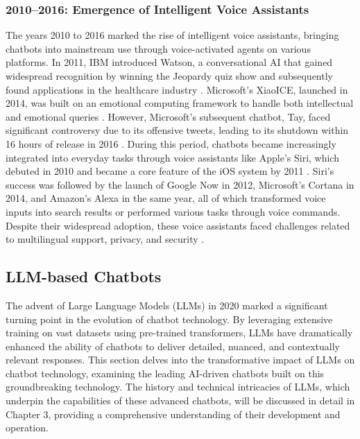 \subsubsection{2010–2016: Emergence of Intelligent Voice Assistants}

The years 2010 to 2016 marked the rise of intelligent voice assistants, bringing chatbots into mainstream use through voice-activated agents on various platforms. In 2011, IBM introduced Watson, a conversational AI that gained widespread recognition by winning the Jeopardy quiz show and subsequently found applications in the healthcare industry \cite{chen2016ibm}. Microsoft's XiaoICE, launched in 2014, was built on an emotional computing framework to handle both intellectual and emotional queries \cite{zhou2020design}. However, Microsoft's subsequent chatbot, Tay, faced significant controversy due to its offensive tweets, leading to its shutdown within 16 hours of release in 2016 \cite{hoy2018alexa}. During this period, chatbots became increasingly integrated into everyday tasks through voice assistants like Apple's Siri, which debuted in 2010 and became a core feature of the iOS system by 2011 \cite{aron2011innovative}. Siri's success was followed by the launch of Google Now in 2012, Microsoft's Cortana in 2014, and Amazon's Alexa in the same year, all of which transformed voice inputs into search results or performed various tasks through voice commands. Despite their widespread adoption, these voice assistants faced challenges related to multilingual support, privacy, and security \cite{bolton2021security}.

\subsection{LLM-based Chatbots}

The advent of Large Language Models (LLMs) in 2020 marked a significant turning point in the evolution of chatbot technology. By leveraging extensive training on vast datasets using pre-trained transformers, LLMs have dramatically enhanced the ability of chatbots to deliver detailed, nuanced, and contextually relevant responses. This section delves into the transformative impact of LLMs on chatbot technology, examining the leading AI-driven chatbots built on this groundbreaking technology. The history and technical intricacies of LLMs, which underpin the capabilities of these advanced chatbots, will be discussed in detail in Chapter 3, providing a comprehensive understanding of their development and operation.

